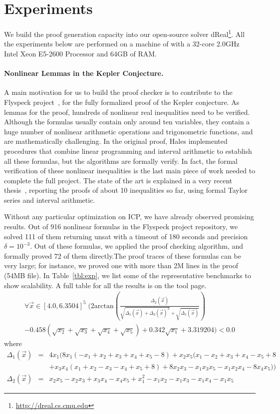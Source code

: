 \section{Experiments}\label{kepler}

We build the proof generation capacity into our open-source solver {\sf
  dReal}\footnote{\url{http://dreal.cs.cmu.edu} }. All the
experiments below are performed on a machine of with a 32-core 2.0GHz Intel
Xeon E5-2600 Processor and 64GB of RAM.
\paragraph{Nonlinear Lemmas in the Kepler Conjecture.} A main motivation for us to build the proof checker is to contribute
to the Flyspeck project~\cite{DBLP:conf/dagstuhl/Hales05}, for the
fully formalized proof of the Kepler conjecture. As lemmas for the
proof, hundreds of nonlinear real inequalities need to be verified.
Although the formulas usually contain only around ten variables, they
contain a huge number of nonlinear arithmetic operations and
trigonometric functions, and are mathematically challenging. In the original proof, Hales implemented procedures that combine
linear programming and interval arithmetic to establish all these
formulas, but the algorithms are formally verify. In
fact, the formal verification of these nonlinear inequalities is the last main piece
of work needed to complete the full project. The state of the art is
explained in a very recent thesis~\cite{keplerthesis}, reporting the
proofs of about 10 inequalities so far, using formal Taylor series and
interval arithmetic.

Without any particular optimization on ICP, we have already observed
promising results. Out of 916 nonlinear formulas in the Flyspeck
project repository, we solved 111 of them returning {\sf unsat} with a
timeout of 180 seconds and precision $\delta=10^{-3}$. Out of these
formulas, we applied the proof checking algorithm, and formally proved
72 of them directly.The proof traces of these formulas can be very
large; for instance, we proved one with more than 2M lines in the
proof (54MB file). In Table~\ref{tbl:exp}, we list some of the
representative benchmarks to show scalability. A full table for all
the results is on the tool page.
\begin{multline*}
\forall\vec{x} \in [4.0, 6.3504]^5\; \Big(2\mathrm{arctan} (\frac{\Delta_2(\vec x)}{\sqrt{\Delta_1(\vec x) + \Delta_2(\vec x)^2} + \sqrt{\Delta_1(\vec x)}})\\
- 0.458(\sqrt{x_2} + \sqrt{x_3} +\sqrt{x_4} + \sqrt{x_5}) + 0.342\sqrt{x_1} + 3.319204\Big) < 0.0
\end{multline*}
where
\begin{eqnarray*}
  \Delta_1(\vec{x}) &=& 4x_1 (8x_1 (-x_1 + x_2 + x_3 + x_4 + x_5 - 8) + x_2 x_5 (x_1 - x_2 + x_3 + x_4 - x_5+8\\%
& &+ x_3x_4(x_1 + x_2 - x_3 - x_4 + x_5 + 8)+ 8 x_2 x_3 - x_1 x_3 x_5 - x_1  x_2  x_4 - 8 x_4 x_5))\\
\Delta_2(\vec{x}) &=& x_2 x_5 -x_2 x_3 + x_3x_4 - x_4 x_5 +x_1^2 -x_1x_2 - x_1x_3 - x_1x_4 -x_1 x_5
\end{eqnarray*}




